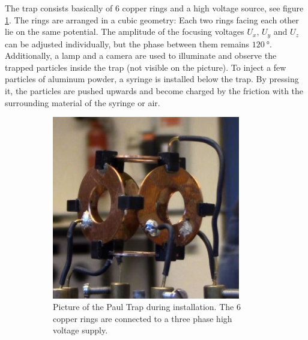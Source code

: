 \documentclass[
	paper=A4,
	parskip=full,
	chapterprefix=true,
	11pt,
	headings=normal,
	bibliography=totoc,
	listof=totoc,
	titlepage=on,
]{scrreprt}
\begin{document}
The trap consists basically of 6 copper rings and a high voltage source, see figure \ref{fig:trap}. The rings are arranged in a cubic geometry: Each two rings facing each other lie on the same potential. The amplitude of the focusing voltages $U_x$, $U_y$ and $U_z$ can be adjusted individually, but the phase between them remains $\SI{120}{\degree}$. Additionally, a lamp and a camera are used to illuminate and observe the trapped particles inside the trap (not visible on the picture). To inject a few particles of aluminum powder, a syringe is installed below the trap. By pressing it, the particles are pushed upwards and become charged by the friction with the surrounding material of the syringe or air. 
\begin{figure}
	\centering
	\begin{subfigure}[t]{0.4\textwidth}
		\includegraphics[width=0.9\textwidth]{capture_20150916_124003_cut}
		\caption{Picture of the Paul Trap during installation. The 6 copper rings are connected to a three phase high voltage supply.}
		\label{fig:trap}
	\end{subfigure}	
	\begin{subfigure}[t]{0.4\textwidth}

\end{subfigure}
\end{figure}
\end{document}
